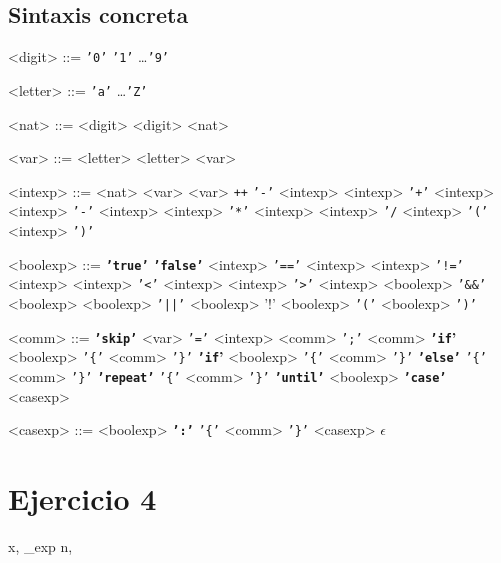 \documentclass{article}
\begin{document}
\subsection*{Sintaxis concreta}
\begin{grammar}

<digit> ::= \texttt{'0'} \alt \texttt{'1'} \alt \dots \alt \texttt{'9'}

<letter> ::= \texttt{'a'} \alt \dots \alt \texttt{'Z'}

<nat> ::= <digit> \alt <digit> <nat>

<var> ::= <letter> \alt <letter> <var>

<intexp> ::= <nat> 
        \alt <var> 
        \alt <var> \texttt{++} 
        \alt \texttt{'-'} <intexp> 
        \alt <intexp> \texttt{'+'} <intexp>
        \alt <intexp> \texttt{'-'} <intexp>
        \alt <intexp> \texttt{'*'} <intexp>
        \alt <intexp> \texttt{'/} <intexp>
        \alt \texttt{'('} <intexp> \texttt{')'}
        
<boolexp> ::= \textbf{\texttt{'true'}}
        \alt \textbf{\texttt{'false'}}
        \alt <intexp> \texttt{'=='} <intexp>
        \alt <intexp> \texttt{'!='} <intexp>
        \alt <intexp> \texttt{'\textless'} <intexp>
        \alt <intexp> \texttt{'\textgreater'} <intexp>
        \alt <boolexp> \texttt{'\&\&'} <boolexp>
        \alt <boolexp> \texttt{'||'} <boolexp>
        \alt '\(!\)' <boolexp>
        \alt \texttt{'('} <boolexp> \texttt{')'}


<comm> ::= \textbf{\texttt{'skip'}}
        \alt <var> \texttt{'='} <intexp>
        \alt <comm> \texttt{';'} <comm>
        \alt \textbf{\texttt{'if}'} <boolexp> \texttt{'\{'} <comm> \texttt{'\}'} 
        \alt \textbf{\texttt{'if}'} <boolexp> \texttt{'\{'} <comm> \texttt{'\}'} 
        \textbf{\texttt{'else'}} \texttt{'\{'} <comm> \texttt{'\}'} 
        \alt \textbf{\texttt{'repeat'}} \texttt{'\{'} <comm> \texttt{'\}'}  \textbf{\texttt{'until'}} <boolexp>
        \alt \textbf{\texttt{'case'}} <casexp>

<casexp> ::= <boolexp> \textbf{\texttt{':'}} \texttt{'\{'} <comm> \texttt{'\}'} <casexp>
       \alt $\epsilon$

\end{grammar}

\section*{Ejercicio 4}
\begin{adjustbox}{center,max width=\textwidth}
    {\langle x, \sigma \rangle
    \Downarrow_{exp}
    \langle n, \sigma \rangle}

    
\end{adjustbox}
\end{document}
